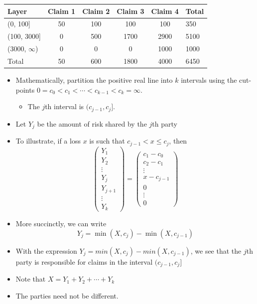 \documentclass[]{book}
\providecommand{\tightlist}{%
  \setlength{\itemsep}{0pt}\setlength{\parskip}{0pt}}
\theoremstyle{definition}
\theoremstyle{definition}
\theoremstyle{definition}
\theoremstyle{remark}
\begin{document}
\begin{longtable}[]{@{}lccccl@{}}
\toprule
Layer & Claim 1 & Claim 2 & Claim 3 & Claim 4 & Total\tabularnewline
\midrule
\endhead
(0, 100{]} & 50 & 100 & 100 & 100 & 350\tabularnewline
(100, 3000{]} & 0 & 500 & 1700 & 2900 & 5100\tabularnewline
(3000, \(\infty\)) & 0 & 0 & 0 & 1000 & 1000\tabularnewline
Total & 50 & 600 & 1800 & 4000 & 6450\tabularnewline
\bottomrule
\end{longtable}

\begin{itemize}
\item
  Mathematically, partition the positive real line into \(k\) intervals
  using the cut-points
  \(0 = c_0 < c_1 < \cdots < c_{k-1} < c_k = \infty\).

  \begin{itemize}
  \tightlist
  \item
    The \(j\)th interval is \((c_{j-1}, c_j]\).
  \end{itemize}
\item
  Let \(Y_j\) be the amount of risk shared by the \(j\)th party
\item
  To illustrate, if a loss \(x\) is such that \(c_{j-1} <x \le c_j\),
  then \[\left(\begin{array}{c}
  Y_1\\ Y_2 \\ \vdots \\ Y_j \\Y_{j+1} \\ \vdots \\Y_k
  \end{array}\right)
  =\left(\begin{array}{c}
  c_1-c_0 \\ c_2-c_1  \\ \vdots \\ x-c_{j-1}  \\ 0 \\ \vdots \\0
  \end{array}\right)\]
\item
  More succinctly, we can write \[Y_j = \min(X,c_j) - \min(X,c_{j-1})\]
\item
  With the expression \(Y_j = min(X,c_j) - min(X,c_{j-1})\), we see that
  the \(j\)th party is responsible for claims in the interval
  \((c_{j-1}, c_j]\)
\item
  Note that \(X = Y_1 + Y_2 + \cdots + Y_k\)
\item
  The parties need not be different.


\end{itemize}
\end{document}
